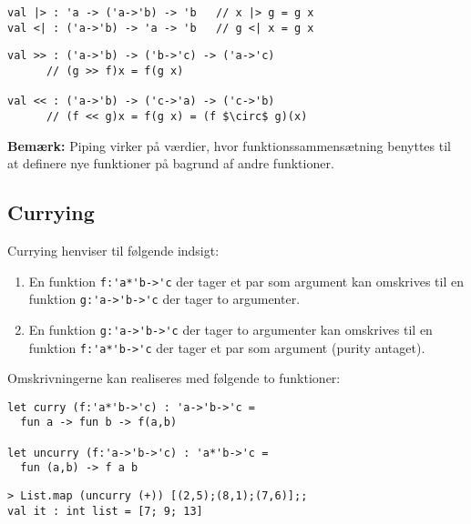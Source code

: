 \documentclass[rgb]{beamer}
\begin{document}
\begin{frame}[fragile]
\begin{small}


\begin{lstlisting}[numbers=none,frame=none,mathescape]
val |> : 'a -> ('a->'b) -> 'b   // x |> g = g x
val <| : ('a->'b) -> 'a -> 'b   // g <| x = g x
\end{lstlisting}


\begin{lstlisting}[numbers=none,frame=none,mathescape]
val >> : ('a->'b) -> ('b->'c) -> ('a->'c)
      // (g >> f)x = f(g x)

val << : ('a->'b) -> ('c->'a) -> ('c->'b)
      // (f << g)x = f(g x) = (f $\circ$ g)(x)
\end{lstlisting}

\textbf{Bemærk:} Piping virker på værdier, hvor funktionssammensætning
benyttes til at definere nye funktioner på bagrund af andre funktioner.

\end{small}
\end{frame}

\subsection{Currying}

\begin{frame}[fragile]
\begin{footnotesize}

  Currying henviser til følgende indsigt:
  \begin{enumerate}
  \item En funktion \lstinline{f:'a*'b->'c} der tager et par som argument kan omskrives til en funktion \lstinline{g:'a->'b->'c} der tager to argumenter.
  \item En funktion \lstinline{g:'a->'b->'c} der tager to argumenter kan omskrives til en funktion \lstinline{f:'a*'b->'c} der tager et par som argument (purity antaget).
  \end{enumerate}

  Omskrivningerne kan realiseres med følgende to funktioner:

\begin{lstlisting}[numbers=none,frame=none,mathescape]
let curry (f:'a*'b->'c) : 'a->'b->'c =
  fun a -> fun b -> f(a,b)

let uncurry (f:'a->'b->'c) : 'a*'b->'c =
  fun (a,b) -> f a b
\end{lstlisting}

\begin{lstlisting}[numbers=none,frame=none,mathescape]
> List.map (uncurry (+)) [(2,5);(8,1);(7,6)];;
val it : int list = [7; 9; 13]
\end{lstlisting}

\end{footnotesize}
\end{frame}
\end{document}
